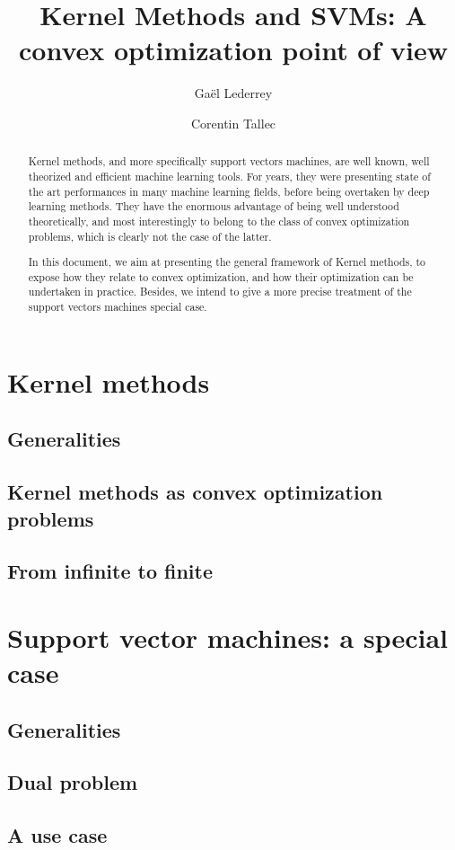 \documentclass[a4paper, 11pt]{article}
\title{Kernel Methods and SVMs:
A convex optimization point of view}
\author{Gaël Lederrey\\
  \and
Corentin Tallec}
\begin{document}
\maketitle
\begin{abstract}
  Kernel methods, and more specifically support vectors machines, are
  well known, well theorized and efficient machine learning tools. For
  years, they were presenting state of the art performances in many
  machine learning fields, before being overtaken by deep learning
  methods. They have the enormous advantage of being well understood
  theoretically, and most interestingly to belong to the class of
  convex optimization problems, which is clearly not the case of the
  latter.

  In this document, we aim at presenting the general framework of
  Kernel methods, to expose how they relate to convex optimization,
  and how their optimization can be undertaken in practice. Besides,
  we intend to give a more precise treatment of the support vectors
  machines special case.
\end{abstract}
\section{Kernel methods}
\subsection{Generalities}
\subsection{Kernel methods as convex optimization problems}
\subsection{From infinite to finite}
\section{Support vector machines: a special case}
\subsection{Generalities}
\subsection{Dual problem}
\subsection{A use case}
\end{document}
